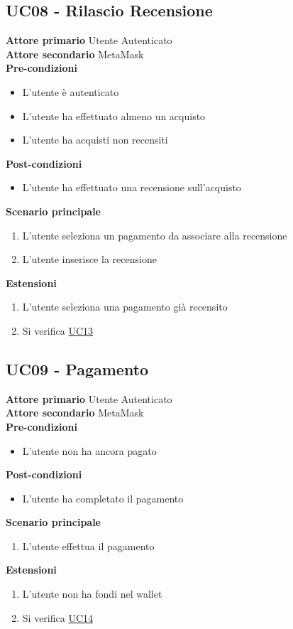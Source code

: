 \subsection{UC08 - Rilascio Recensione}
\label{UC08}
\textbf{Attore primario} Utente Autenticato \\
\textbf{Attore secondario} MetaMask \\
\textbf{Pre-condizioni}
\begin{itemize}
    \item L'utente è autenticato
    \item L'utente ha effettuato almeno un acquisto
    \item L'utente ha acquisti non recensiti
\end{itemize}
\textbf{Post-condizioni}
\begin{itemize}
    \item L'utente ha effettuato una recensione sull'acquisto
\end{itemize}
\textbf{Scenario principale}
\begin{enumerate}
    \item L'utente seleziona un pagamento da associare alla recensione
    \item L'utente inserisce la recensione
\end{enumerate}
\textbf{Estensioni}
\begin{enumerate}
    \item L'utente seleziona una pagamento già recensito
    \item Si verifica \hyperref[UC13]{UC13}
\end{enumerate}

\subsection{UC09 - Pagamento}
\label{UC09}
\textbf{Attore primario} Utente Autenticato \\
\textbf{Attore secondario} MetaMask \\
\textbf{Pre-condizioni}
\begin{itemize}
    \item L'utente non ha ancora pagato
\end{itemize}
\textbf{Post-condizioni}
\begin{itemize}
    \item L'utente ha completato il pagamento
\end{itemize}
\textbf{Scenario principale}
\begin{enumerate}
    \item L'utente effettua il pagamento
\end{enumerate}
\textbf{Estensioni}
\begin{enumerate}
    \item L'utente non ha fondi nel wallet
    \item Si verifica \hyperref[UC14]{UC14}
\end{enumerate}

